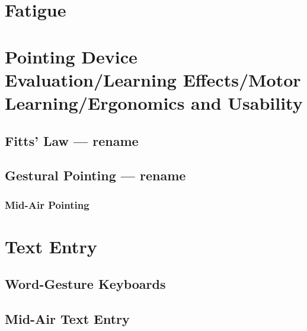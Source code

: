 \section{Fatigue}

\section{Pointing Device Evaluation/Learning Effects/Motor Learning/Ergonomics and Usability}

\subsection{Fitts' Law --- rename}

\subsection{Gestural Pointing --- rename}

\subsubsection{Mid-Air Pointing}

\section{Text Entry}

\subsection{Word-Gesture Keyboards}

\subsection{Mid-Air Text Entry}
